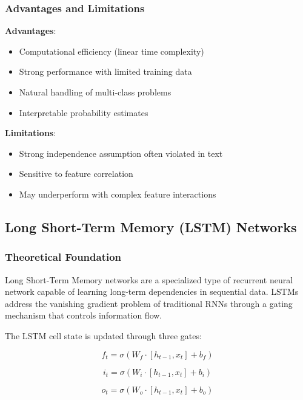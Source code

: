 \documentclass[11pt,a4paper]{article}
\begin{document}
\subsubsection{Advantages and Limitations}

\textbf{Advantages}:
\begin{itemize}
    \item Computational efficiency (linear time complexity)
    \item Strong performance with limited training data
    \item Natural handling of multi-class problems
    \item Interpretable probability estimates
\end{itemize}

\textbf{Limitations}:
\begin{itemize}
    \item Strong independence assumption often violated in text
    \item Sensitive to feature correlation
    \item May underperform with complex feature interactions
\end{itemize}

\subsection{Long Short-Term Memory (LSTM) Networks}

\subsubsection{Theoretical Foundation}

Long Short-Term Memory networks are a specialized type of recurrent neural network capable of learning long-term dependencies in sequential data. LSTMs address the vanishing gradient problem of traditional RNNs through a gating mechanism that controls information flow.

The LSTM cell state is updated through three gates:

\begin{equation}
f_t = \sigma(W_f \cdot [h_{t-1}, x_t] + b_f)
\end{equation}

\begin{equation}
i_t = \sigma(W_i \cdot [h_{t-1}, x_t] + b_i)
\end{equation}

\begin{equation}
o_t = \sigma(W_o \cdot [h_{t-1}, x_t] + b_o)
\end{equation}
\end{document}
